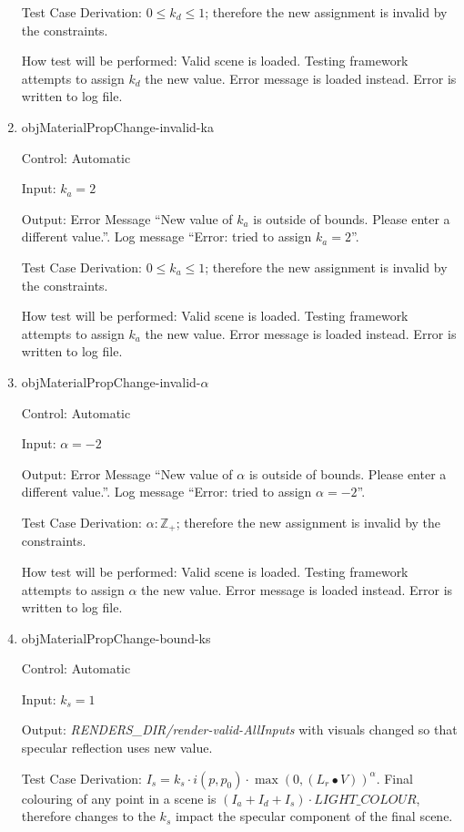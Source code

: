 \documentclass[12pt, titlepage]{article}
\begin{document}
\begin{enumerate}
	Test Case Derivation: $0 \le k_{d} \le 1$; therefore the new assignment is 
	invalid by the constraints.
	
	How test will be performed: Valid scene is loaded. Testing framework 
	attempts to assign $k_{d}$ the new value. Error message is loaded instead. 
	Error is written to log file.
	
	\item{objMaterialPropChange-invalid-ka\\}
	
	Control: Automatic
	
	Input: $k_{a} = 2$
	
	Output: Error Message ``New value of $k_{a}$ is outside of bounds. Please 
	enter a different value.''. Log message ``Error: tried to assign $k_{a} = 
	2$''. 
	
	Test Case Derivation: $0 \le k_{a} \le 1$; therefore the new assignment is 
	invalid by the constraints.
	
	How test will be performed: Valid scene is loaded. Testing framework 
	attempts to assign $k_{a}$ the new value. Error message is loaded instead. 
	Error is written to log file.

	\item{objMaterialPropChange-invalid-$\alpha$\\}
	
	Control: Automatic
	
	Input: $\alpha = -2$
	
	Output: Error Message ``New value of $\alpha$ is outside of bounds. Please 
	enter a different value.''. Log message ``Error: tried to assign $\alpha = 
	-2$''. 
	
	Test Case Derivation: $\alpha : \mathbb{Z_{+}}$; therefore the new 
	assignment 
	is invalid by the constraints.
	
	How test will be performed: Valid scene is loaded. Testing framework 
	attempts to assign $\alpha$ the new value. Error message is loaded instead. 
	Error is written to log file.

	\item{objMaterialPropChange-bound-ks\\}
	
	Control: Automatic
	
	Input: $k_{s} = 1$
	
	Output: \textit{RENDERS\_DIR/render-valid-AllInputs} with visuals changed 
	so that specular reflection uses new value.
	
	Test Case Derivation: $I_{s} = k_{s}\cdot i(p,p_{0}) \cdot \max(0, 
	({L_{r}}\bullet V))^\alpha$. Final colouring of any point in a scene is 
	$(I_{a}+I_{d}+I_{s})\cdot LIGHT\_COLOUR$, therefore changes to the $k_{s}$ 
	impact the specular component of the final scene.
	

\end{enumerate}
\end{document}
